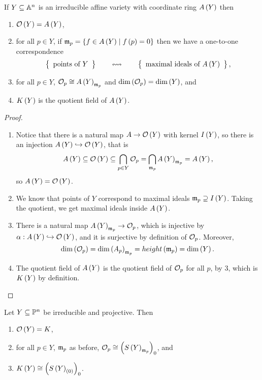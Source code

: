 \begin{theorem}
If $ Y \subseteq \A^n $ is an irreducible affine variety with coordinate ring $ A\rb{Y} $ then
\begin{enumerate}
\item $ \OO\rb{Y} = A\rb{Y} $,
\item for all $ p \in Y $, if $ \mm_p = \cb{f \in A\rb{Y} \mid f\rb{p} = 0} $ then we have a one-to-one correspondence
$$ \correspondence{\text{points of} \ Y}{\text{maximal ideals of} \ A\rb{Y}}, $$
\item for all $ p \in Y $, $ \OO_p \cong A\rb{Y}_{\mm_p} $ and $ \dim\rb{\OO_p} = \dim\rb{Y} $, and
\item $ K\rb{Y} $ is the quotient field of $ A\rb{Y} $.
\end{enumerate}
\end{theorem}

\begin{proof}
\hfill
\begin{enumerate}
\item Notice that there is a natural map $ A \to \OO\rb{Y} $ with kernel $ I\rb{Y} $, so there is an injection $ A\rb{Y} \hookrightarrow \OO\rb{Y} $, that is
$$ A\rb{Y} \subseteq \OO\rb{Y} \subseteq \bigcap_{p \in Y} \OO_p = \bigcap_{\mm_p} A\rb{Y}_{\mm_p} = A\rb{Y}, $$
so $ A\rb{Y} = \OO\rb{Y} $.
\item We know that points of $ Y $ correspond to maximal ideals $ \mm_p \supseteq I\rb{Y} $. Taking the quotient, we get maximal ideals inside $ A\rb{Y} $.
\item There is a natural map $ A\rb{Y}_{\mm_p} \to \OO_p $, which is injective by $ \alpha : A\rb{Y} \hookrightarrow \OO\rb{Y} $, and it is surjective by definition of $ \OO_p $. Moreover,
$$ \dim\rb{\OO_p} = \dim\rb{A_p}_{\mm_p} = height\rb{\mm_p} = \dim\rb{Y}. $$
\item The quotient field of $ A\rb{Y} $ is the quotient field of $ \OO_p $ for all $ p $, by $ 3 $, which is $ K\rb{Y} $ by definition.
\end{enumerate}
\end{proof}

\begin{theorem}
Let $ Y \subseteq \P^n $ be irreducible and projective. Then
\begin{enumerate}
\item $ \OO\rb{Y} = K $,
\item for all $ p \in Y $, $ \mm_p $ as before, $ \OO_p \cong \rb{S\rb{Y}_{\mm_p}}_0 $, and
\item $ K\rb{Y} \cong \rb{S\rb{Y}_{\rb{0}}}_0 $.
\end{enumerate}
\end{theorem}

